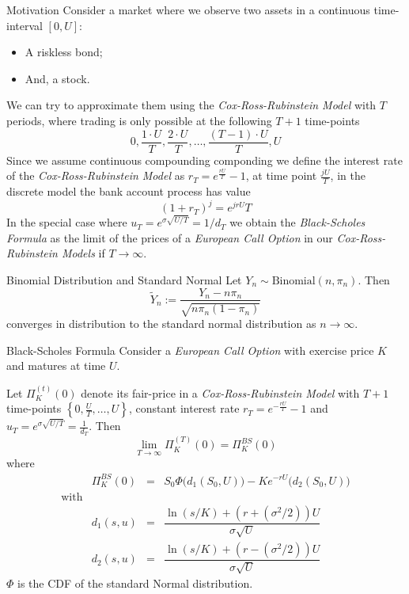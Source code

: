 \documentclass[11pt,a4paper]{article}
\begin{document}
  \begin{remark}{Motivation}
    Consider a market where we observe two assets in a continuous time-interval $[0,U]$:
    \begin{itemize}
      \item A riskless bond;
      \item And, a stock.
    \end{itemize}
    We can try to approximate them using the \textit{Cox-Ross-Rubinstein Model} with $T$ periods, where trading is only possible at the following $T+1$ time-points
    \[ 0,\frac{1\cdot U}T,\frac{2\cdot U}T,\dots,\frac{(T-1)\cdot U}T,U \]
    Since we assume continuous compounding componding we define the interest rate of the \textit{Cox-Ross-Rubinstein Model} as $r_T=e^{\frac{rU}T}-1$, at time point $\frac{jU}T$, in the discrete model the bank account process has value
    \[ (1+r_T)^j=e^{jrU}T \]
    In the special case where $u_T=e^{\sigma\sqrt{U/T}}=1/d_T$ we obtain the \textit{Black-Scholes Formula} as the limit of the prices of a \textit{European Call Option} in our \textit{Cox-Ross-Rubinstein Models} if $T\to\infty$.
  \end{remark}

  \begin{theorem}{Binomial Distribution and Standard Normal}\label{the_binomial_distribution_and_standard_normal}
    Let $Y_n\sim\text{Binomial}(n,\pi_n)$. Then
    \[ \tilde{Y}_n:=\frac{Y_n-n\pi_n}{\sqrt{n\pi_n(1-\pi_n)}} \]
    converges in distribution to the standard normal distribution as $n\to\infty$.
  \end{theorem}

  \begin{theorem}{Black-Scholes Formula}\label{the_black_scholes_formula}
    Consider a \textit{European Call Option} with exercise price $K$ and matures at time $U$.
    \par Let $\Pi_K^{(t)}(0)$ denote its fair-price in a \textit{Cox-Ross-Rubinstein Model} with $T+1$ time-points $\left\{0,\frac{U}T,\dots,U\right\}$, constant interest rate $r_T=e^{-\frac{rU}T}-1$ and $u_T=e^{\sigma\sqrt{U/T}}=\frac1{d_T}$. Then
    \[ \lim_{T\to\infty}\Pi_K^{(T)}(0)=\Pi_K^{BS}(0) \]
    where
    \[\begin{array}{rrcl}
      &\Pi_K^{BS}(0)&=&S_0\Phi\big(d_1(S_0,U)\big)-Ke^{-rU}\big(d_2(S_0,U)\big)\\
      \text{with}\\
      &d_1(s,u)&=&\dfrac{\ln(s/K)+\left(r+(\sigma^2/2)\right)U}{\sigma\sqrt{U}}\\
      &d_2(s,u)&=&\dfrac{\ln(s/K)+\left(r-(\sigma^2/2)\right)U}{\sigma\sqrt{U}}
    \end{array}\]
    $\Phi$ is the CDF of the standard Normal distribution.
  \end{theorem}
\end{document}
